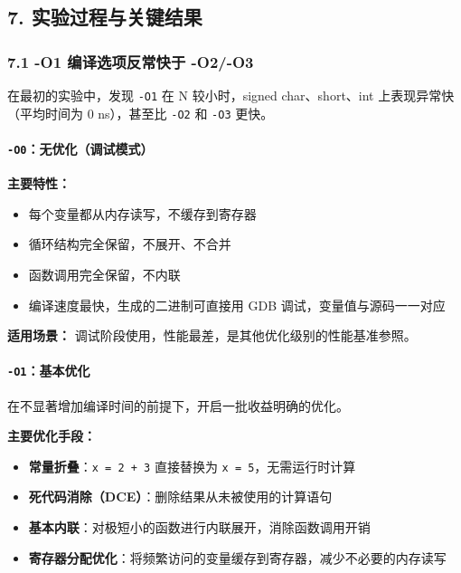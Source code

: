 \documentclass[12pt,fontset=none]{ctexart}
\providecommand{\tightlist}{%
  \setlength{\itemsep}{0pt}\setlength{\parskip}{0pt}}
\begin{document}
\subsection{7.
实验过程与关键结果}\label{7-ux5b9eux9a8cux8fc7ux7a0bux4e0eux5173ux952eux7ed3ux679c}

\subsubsection{7.1 -O1 编译选项反常快于
-O2/-O3}\label{71--o1-ux7f16ux8bd1ux9009ux9879ux53cdux5e38ux5febux4e8e--o2-o3}

在最初的实验中，发现 \texttt{-O1} 在 N 较小时，signed char、short、int
上表现异常快（平均时间为 0 ns），甚至比 \texttt{-O2} 和 \texttt{-O3}
更快。

\paragraph{\texorpdfstring{\texttt{-O0}：无优化（调试模式）}{-O0：无优化（调试模式）}}\label{-o0ux65e0ux4f18ux5316ux8c03ux8bd5ux6a21ux5f0f}

\textbf{主要特性：}

\begin{itemize}
\tightlist
\item
  每个变量都从内存读写，不缓存到寄存器
\item
  循环结构完全保留，不展开、不合并
\item
  函数调用完全保留，不内联
\item
  编译速度最快，生成的二进制可直接用 GDB 调试，变量值与源码一一对应
\end{itemize}

\textbf{适用场景：}
调试阶段使用，性能最差，是其他优化级别的性能基准参照。

\paragraph{\texorpdfstring{\texttt{-O1}：基本优化}{-O1：基本优化}}\label{-o1ux57faux672cux4f18ux5316}

在不显著增加编译时间的前提下，开启一批收益明确的优化。

\textbf{主要优化手段：}

\begin{itemize}
\tightlist
\item
  \textbf{常量折叠}：\texttt{x\ =\ 2\ +\ 3} 直接替换为
  \texttt{x\ =\ 5}，无需运行时计算
\item
  \textbf{死代码消除（DCE）}：删除结果从未被使用的计算语句
\item
  \textbf{基本内联}：对极短小的函数进行内联展开，消除函数调用开销
\item
  \textbf{寄存器分配优化}：将频繁访问的变量缓存到寄存器，减少不必要的内存读写
\end{itemize}
\end{document}
